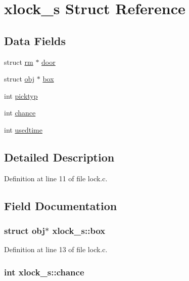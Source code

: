 \hypertarget{structxlock__s}{\section{xlock\+\_\+s Struct Reference}
\label{structxlock__s}
}
\subsection*{Data Fields}
\begin{DoxyCompactItemize}
\item 
struct \hyperlink{structrm}{rm} $\ast$ \hyperlink{structxlock__s_a4e74d1288459a9d475d99f3b729a5276}{door}
\item 
struct \hyperlink{structobj}{obj} $\ast$ \hyperlink{structxlock__s_af2a12b515a976bc24804b86abca8c39b}{box}
\item 
int \hyperlink{structxlock__s_a0e6243e3d63517ca861316763f417efd}{picktyp}
\item 
int \hyperlink{structxlock__s_a2f5c7819a8c5ce28ce18bb73fb5fb884}{chance}
\item 
int \hyperlink{structxlock__s_a1437d19db36015e78beb456cf7cba2bb}{usedtime}
\end{DoxyCompactItemize}


\subsection{Detailed Description}


Definition at line 11 of file lock.\+c.



\subsection{Field Documentation}
\hypertarget{structxlock__s_af2a12b515a976bc24804b86abca8c39b}{
\subsubsection[{box}]{\setlength{\rightskip}{0pt plus 5cm}struct {\bf obj}$\ast$ xlock\+\_\+s\+::box}}\label{structxlock__s_af2a12b515a976bc24804b86abca8c39b}


Definition at line 13 of file lock.\+c.

\hypertarget{structxlock__s_a2f5c7819a8c5ce28ce18bb73fb5fb884}{
\subsubsection[{chance}]{\setlength{\rightskip}{0pt plus 5cm}int xlock\+\_\+s\+::chance}}\label{structxlock__s_a2f5c7819a8c5ce28ce18bb73fb5fb884}


